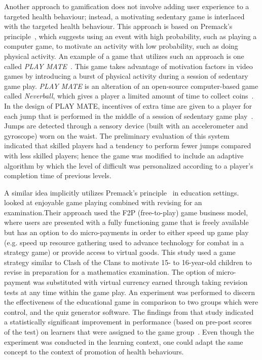 Another approach to gamification does not involve adding user experience to a targeted health behaviour; instead, a motivating sedentary game is interlaced with the targeted health behaviour. This approach is based on Premack's principle~\citep{premack1959toward}, which suggests using an event with high probability, such as playing a computer game, to motivate an activity with low probability, such as doing physical activity. An example of a game that utilizes such an approach is one called \emph{PLAY MATE}~\citep{berkovsky2010physical,berkovsky2012physical}. This game takes advantage of motivation factors in video games by introducing a burst of physical activity during a session of  sedentary game play. \emph{PLAY MATE} is an alteration of an open-source computer-based game called \emph{Neverball}, which gives a player a limited amount of time to collect coins~\citep{berkovsky2012physical}. In the design of PLAY MATE, incentives of extra time are given to a player for each jump that is performed in the middle of a session of sedentary game play~\citep{berkovsky2012physical}. Jumps are detected through a sensory device (built with an accelerometer and gyroscope) worn on the waist. The preliminary evaluation of this system indicated that skilled players had a tendency to perform fewer jumps compared with less skilled players; hence the game was modified to include an adaptive algorithm by which the level of difficult was personalized according to a player's completion time of previous levels.

A similar idea implicitly utilizes Premack's principle~\citep{premack1959toward} in education settings.~\cite{preist2015use} looked at enjoyable game playing combined with revising for an examination.Their approach used the F2P (free-to-play) game business model, where users are presented with a fully functioning game that is freely available but has an option to do micro-payments in order to either speed up game play (e.g. speed up resource gathering used to advance technology for combat in a strategy game) or provide access to virtual goods. This study used a game strategy similar to Clash of the Clans to motivate 15- to 16-year-old children to revise in preparation for a mathematics examination. The option of micro-payment was substituted with virtual currency earned through taking revision tests at any time within the game play. An experiment was performed to discern the effectiveness of the educational game in comparison to two groups which were control, and the quiz generator software. The findings from that study indicated a statistically significant improvement in performance (based on pre-post scores of the test) on learners that were assigned to the game group~\citep{preist2015use}. Even though the experiment was conducted in the learning context, one could adapt the same concept to the context of promotion of health behaviours.

